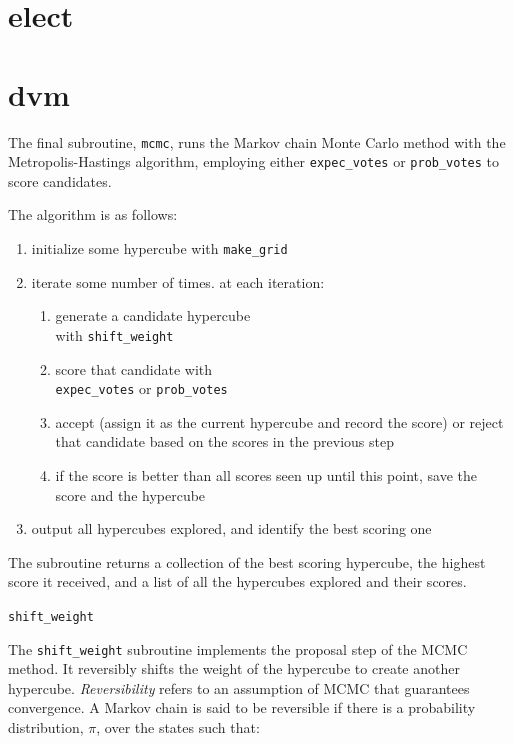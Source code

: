 \section{elect}


\section{dvm}

The final subroutine, \texttt{mcmc}, runs the Markov chain Monte Carlo method with the Metropolis-Hastings algorithm, employing either \texttt{expec\_votes} or \texttt{prob\_votes} to score candidates.

The algorithm is as follows:

\begin{enumerate}
  \item initialize some hypercube with \texttt{make\_grid}
  \item iterate some number of times. at each iteration:
  \begin{enumerate}
    \item generate a candidate hypercube \\ with \texttt{shift\_weight}
    \item score that candidate with \\ \texttt{expec\_votes} or \texttt{prob\_votes}
    \item accept (assign it as the current hypercube and record the score) or reject that candidate based on the scores in the previous step
    \item if the score is better than all scores seen up until this point, save the score and the hypercube
  \end{enumerate}
  \item output all hypercubes explored, and identify the best scoring one
\end{enumerate}

The subroutine returns a collection of the best scoring hypercube, the highest score it received, and a list of all the hypercubes explored and their scores.


\texttt{shift\_weight}


The \texttt{shift\_weight} subroutine implements the proposal step of the MCMC method. It reversibly shifts the weight of the hypercube to create another hypercube. \textit{Reversibility} refers to an assumption of MCMC that guarantees convergence. A Markov chain is said to be reversible if there is a probability distribution, $\pi$, over the states such that:

